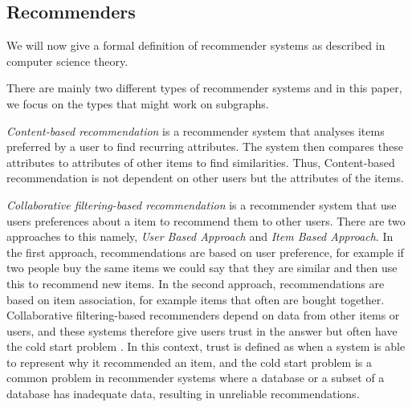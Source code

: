 \subsection{Recommenders}
\label{recommenders}
We will now give a formal definition of recommender systems as described in computer science theory.

There are mainly two different  types of recommender systems and in this paper, we focus on the types that might work on subgraphs.

\textit{Content-based recommendation} is a recommender system that analyses items preferred by a user to find recurring attributes. The system then compares these attributes to attributes of other items to find similarities\cite{lu2015recommender}. Thus, Content-based recommendation is not dependent on other users but the attributes of the items.

\textit{Collaborative filtering-based recommendation} is a recommender system that use users preferences about a item to recommend them to other users. There are two approaches to this namely, \textit{User Based Approach} and \textit{Item Based Approach}. In the first approach, recommendations are based on user preference, for example if two people buy the same items we could say that they are similar and then use this to recommend new items. In the second approach, recommendations are based on item association, for example items that often are bought together.
Collaborative filtering-based recommenders depend on data from other items or users, and these systems therefore give users trust in the answer but often have the cold start problem \cite{lu2015recommender}. In this context, trust is defined as when a system is able to represent why it recommended an item, and the cold start problem is a common problem in recommender systems where a database or a subset of a database has inadequate data, resulting in unreliable recommendations\cite{Ricci2015}.
